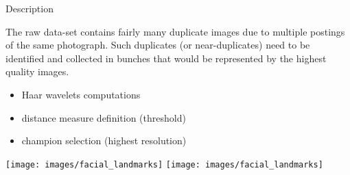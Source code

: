 
\begin{xpsectionbox}{Description}{}

The raw data-set contains fairly many duplicate images due to multiple postings of the same photograph. Such duplicates (or near-duplicates) need to be identified and collected in bunches that would be represented by the highest quality images.

\begin{minipage}{0.4\linewidth}

\begin{itemize}
	  \item Haar wavelets computations
	  \item distance measure definition (threshold)
	  \item champion selection (highest resolution)
\end{itemize}
\end{minipage}
\begin{minipage}{0.6\linewidth}

\begin{center}
			\texttt{[image: images/facial\_landmarks]}
			\texttt{[image: images/facial\_landmarks]}
\end{center}

\end{minipage}
\end{xpsectionbox}

